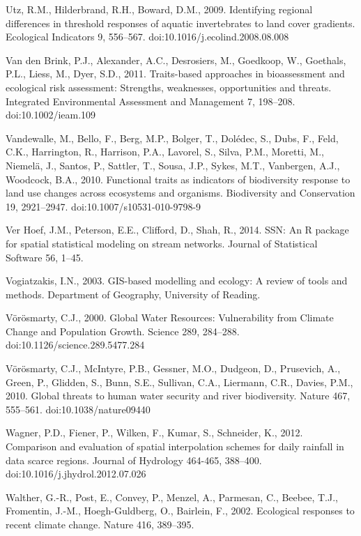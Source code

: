\begin{thebibliography}
\bibitem{} \hangindent=1cm Utz, R.M., Hilderbrand, R.H., Boward, D.M., 2009. Identifying regional differences in threshold responses of aquatic invertebrates to land cover gradients. Ecological Indicators 9, 556–567. doi:10.1016/j.ecolind.2008.08.008

\bibitem{} \hangindent=1cm Van den Brink, P.J., Alexander, A.C., Desrosiers, M., Goedkoop, W., Goethals, P.L., Liess, M., Dyer, S.D., 2011. Traits-based approaches in bioassessment and ecological risk assessment: Strengths, weaknesses, opportunities and threats. Integrated Environmental Assessment and Management 7, 198–208. doi:10.1002/ieam.109

\bibitem{} \hangindent=1cm Vandewalle, M., Bello, F., Berg, M.P., Bolger, T., Dolédec, S., Dubs, F., Feld, C.K., Harrington, R., Harrison, P.A., Lavorel, S., Silva, P.M., Moretti, M., Niemelä, J., Santos, P., Sattler, T., Sousa, J.P., Sykes, M.T., Vanbergen, A.J., Woodcock, B.A., 2010. Functional traits as indicators of biodiversity response to land use changes across ecosystems and organisms. Biodiversity and Conservation 19, 2921–2947. doi:10.1007/s10531-010-9798-9

\bibitem{} \hangindent=1cm Ver Hoef, J.M., Peterson, E.E., Clifford, D., Shah, R., 2014. SSN: An R package for spatial statistical modeling on stream networks. Journal of Statistical Software 56, 1–45.

\bibitem{} \hangindent=1cm Vogiatzakis, I.N., 2003. GIS-based modelling and ecology: A review of tools and methods. Department of Geography, University of Reading.

\bibitem{} \hangindent=1cm Vörösmarty, C.J., 2000. Global Water Resources: Vulnerability from Climate Change and Population Growth. Science 289, 284–288. doi:10.1126/science.289.5477.284

\bibitem{} \hangindent=1cm Vörösmarty, C.J., McIntyre, P.B., Gessner, M.O., Dudgeon, D., Prusevich, A., Green, P., Glidden, S., Bunn, S.E., Sullivan, C.A., Liermann, C.R., Davies, P.M., 2010. Global threats to human water security and river biodiversity. Nature 467, 555–561. doi:10.1038/nature09440

\bibitem{} \hangindent=1cm Wagner, P.D., Fiener, P., Wilken, F., Kumar, S., Schneider, K., 2012. Comparison and evaluation of spatial interpolation schemes for daily rainfall in data scarce regions. Journal of Hydrology 464-465, 388–400. doi:10.1016/j.jhydrol.2012.07.026

\bibitem{} \hangindent=1cm Walther, G.-R., Post, E., Convey, P., Menzel, A., Parmesan, C., Beebee, T.J., Fromentin, J.-M., Hoegh-Guldberg, O., Bairlein, F., 2002. Ecological responses to recent climate change. Nature 416, 389–395.


\end{thebibliography}
